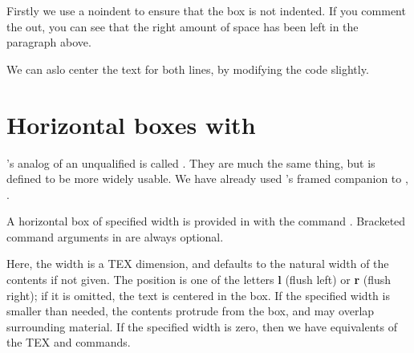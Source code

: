 {%
{}%

Firstly we use a noindent to ensure that the box is not indented. If you comment the out, you can see that the right amount of space has been left in the paragraph above.

\mbox{}
 
\noindent
{}%


\begin{marginfigure}
\noindent
{}%
\end{marginfigure}
We can aslo center the text for both lines, by modifying the code slightly.
\begin{teX}
\noindent
{}%
\end{teX}

\begin{marginfigure}
\noindent
{}%
\end{marginfigure}


\section{Horizontal boxes with \protect\LaTeXe}

\latex's analog of an unqualified  is called . They are 
much the
same thing, but  is defined to be more widely usable. We have already
used \latex's framed companion to , .

A horizontal box of specified width is provided in \latex with the command
. Bracketed command arguments
in \latex are always optional. 

Here, the width is a TEX dimension,
and defaults to the natural width of the contents if not given. The position
is one of the letters \textbf{l} (flush left) or \textbf{r} (flush right); if it is omitted, the text
is centered in the box. If the specified width is smaller than needed, the
contents protrude from the box, and may overlap surrounding material. If
the specified width is zero, then we have equivalents of the TEX  and
 commands.


}
